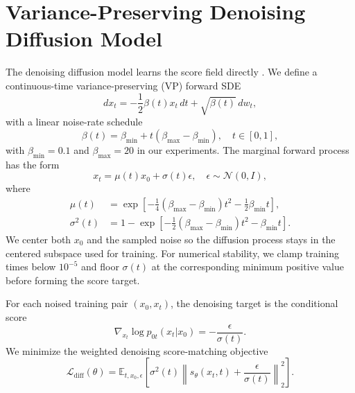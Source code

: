 \documentclass[reprint,amsmath,amssymb,aps,pra,10pt]{revtex4-2}
\begin{document}
\section{Variance-Preserving Denoising Diffusion Model}

The denoising diffusion model learns the score field directly \cite{ho2020,song2021}.
We define a continuous-time variance-preserving (VP) forward SDE
\begin{equation}
    dx_t
    =
    -\frac{1}{2}\beta(t)x_t\,dt
    +
    \sqrt{\beta(t)}\,dw_t,
\end{equation}
with a linear noise-rate schedule
\begin{equation}
    \beta(t) = \beta_{\min} + t(\beta_{\max}-\beta_{\min}),
    \quad
    t \in [0,1],
\end{equation}
with $\beta_{\min}=0.1$ and $\beta_{\max}=20$ in our experiments.
The marginal forward process has the form
\begin{equation}
    x_t = \mu(t)x_0 + \sigma(t)\epsilon,
    \quad
    \epsilon \sim \mathcal{N}(0,I),
\end{equation}
where
\begin{align}
    \mu(t)
    &=
    \exp
    \left[
        -\frac{1}{4}(\beta_{\max}-\beta_{\min})t^2
        -
        \frac{1}{2}\beta_{\min}t
    \right], \\
    \sigma^2(t)
    &=
    1
    -
    \exp
    \left[
        -\frac{1}{2}(\beta_{\max}-\beta_{\min})t^2
        -
        \beta_{\min}t
    \right].
\end{align}
We center both $x_0$ and the sampled noise so the diffusion process stays in the centered subspace used for training.
For numerical stability, we clamp training times below $10^{-5}$ and floor $\sigma(t)$ at the corresponding minimum positive value before forming the score target.

For each noised training pair $(x_0,x_t)$, the denoising target is the conditional score
\begin{equation}
    \nabla_{x_t}\log p_{0t}(x_t|x_0)
    =
    -\frac{\epsilon}{\sigma(t)}.
\end{equation}
We minimize the weighted denoising score-matching objective \cite{ho2020,song2021}
\begin{equation}
    \mathcal{L}_{\mathrm{diff}}(\theta)
    =
    \mathbb{E}_{t,x_0,\epsilon}
    \left[
        \sigma^2(t)
        \left\|
            s_\theta(x_t,t)
            +
            \frac{\epsilon}{\sigma(t)}
        \right\|_2^2
    \right].
\end{equation}
\end{document}
